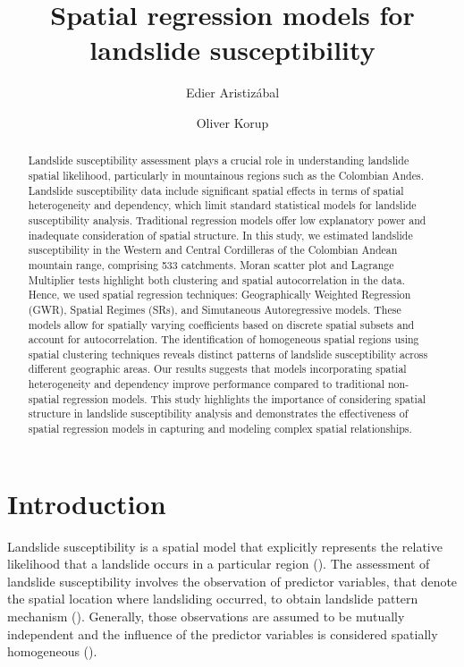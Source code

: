 \documentclass[
  manuscript=article,  
  layout=preprint,  
  year=2023,
  volume=0,
]{format}
\title{Spatial regression models for landslide susceptibility}
\author{Edier Aristizábal}
\affiliation{Departamento de Geociencias y Medio Ambiente, Universidad Nacional de Colombia, Medellín, Colombia}
\author{Oliver Korup}
\affiliation{Institute of Environmental Science and Geography, University of Potsdam, Germany}
\begin{document}
\begin{abstract}
Landslide susceptibility assessment plays a crucial role in understanding landslide spatial likelihood, particularly in mountainous regions such as the Colombian Andes.  Landslide susceptibility data include significant spatial effects in terms of spatial heterogeneity and dependency, which limit standard statistical models for landslide susceptibility analysis. Traditional regression models offer low explanatory power and inadequate consideration of spatial structure. In this study, we estimated landslide susceptibility in the Western and Central Cordilleras of the Colombian Andean mountain range, comprising 533 catchments. Moran scatter plot and Lagrange Multiplier tests highlight both clustering and spatial autocorrelation in the data. Hence, we used spatial regression techniques: Geographically Weighted Regression (GWR), Spatial Regimes (SRs), and Simutaneous Autoregressive models. These models allow for spatially varying coefficients based on discrete spatial subsets and account for autocorrelation. The identification of homogeneous spatial regions using spatial clustering techniques reveals distinct patterns of landslide susceptibility across different geographic areas. Our results suggests that models incorporating spatial heterogeneity and dependency improve performance compared to traditional non-spatial regression models. This study highlights the importance of considering spatial structure in landslide susceptibility analysis and demonstrates the effectiveness of spatial regression models in capturing and modeling complex spatial relationships.
\end{abstract}

\section{Introduction}
\par Landslide susceptibility is a spatial model that explicitly represents the relative likelihood that a landslide occurs in a particular region (\cite{brabb1984innovative, corominas2014recommendations, fell2008guidelines}). The assessment of landslide susceptibility involves the observation of predictor variables, that denote the spatial location where landsliding occurred, to obtain landslide pattern mechanism (\cite{reichenbach2018, soeters1996, montgomery1994}). Generally, those observations are assumed to be mutually independent and the influence of the predictor variables is considered spatially homogeneous (\cite{xiao2021reducing}).
\end{document}
